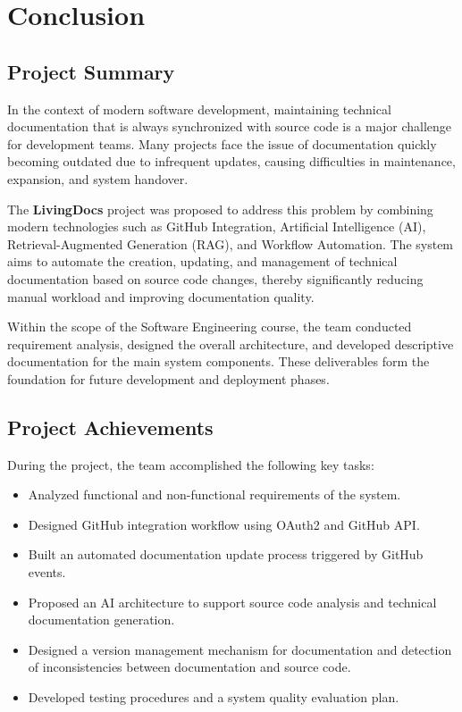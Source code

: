 \section{Conclusion}

\subsection{Project Summary}
In the context of modern software development, maintaining technical documentation that is always synchronized with source code is a major challenge for development teams. Many projects face the issue of documentation quickly becoming outdated due to infrequent updates, causing difficulties in maintenance, expansion, and system handover.

The \textbf{LivingDocs} project was proposed to address this problem by combining modern technologies such as GitHub Integration, Artificial Intelligence (AI), Retrieval-Augmented Generation (RAG), and Workflow Automation. The system aims to automate the creation, updating, and management of technical documentation based on source code changes, thereby significantly reducing manual workload and improving documentation quality.

Within the scope of the Software Engineering course, the team conducted requirement analysis, designed the overall architecture, and developed descriptive documentation for the main system components. These deliverables form the foundation for future development and deployment phases.

\subsection{Project Achievements}
During the project, the team accomplished the following key tasks:
\begin{itemize}
    \item Analyzed functional and non-functional requirements of the system.
    \item Designed GitHub integration workflow using OAuth2 and GitHub API.
    \item Built an automated documentation update process triggered by GitHub events.
    \item Proposed an AI architecture to support source code analysis and technical documentation generation.
    \item Designed a version management mechanism for documentation and detection of inconsistencies between documentation and source code.
    \item Developed testing procedures and a system quality evaluation plan.
\end{itemize}


